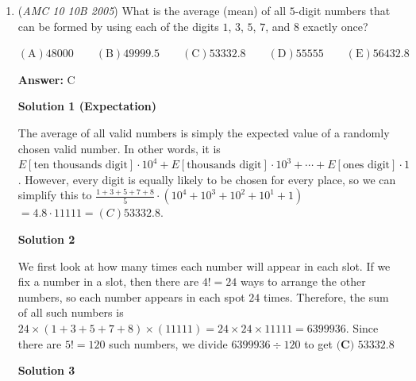 \begin{enumerate}
 



\textbf{Solution 2}

The remaining $30\%$ of the students got $95$ points.The mean is equal to $10\%\cdot70 + 25\%\cdot80 + 20\%\cdot85 + 15\%\cdot90 + 30\%\cdot95 = 86$.The score greater than or equal to $50\%$ of other scores is the median. Since $35\%$ scored $80$ or lower and the next $20\%$ scored $85$, the median is $85$. The difference between the mean and the median is $\boxed{\textbf{(B)}\ 1}$.

 


	\item (\textit{AMC 10 10B 2005}) What is the average (mean) of all $5$-digit numbers that can be formed by using each of the digits $1$, $3$, $5$, $7$, and $8$ exactly once?


 $\mathrm{(A)} 48000 \qquad \mathrm{(B)} 49999.5 \qquad \mathrm{(C)} 53332.8 \qquad \mathrm{(D)} 55555 \qquad \mathrm{(E)} 56432.8$

 \textbf{Answer: }C



\textbf{Solution 1 (Expectation)}

The average of all valid numbers is simply the expected value of a randomly chosen valid number. In other words, it is $E[\text{ten thousands digit}]\cdot 10^4+E[\text{thousands digit}]\cdot 10^3+\cdots+E[\text{ones digit}]\cdot 1$. However, every digit is equally likely to be chosen for every place, so we can simplify this to $\frac{1+3+5+7+8}{5}\cdot(10^4+10^3+10^2+10^1+1)$ $=4.8\cdot11111 = \boxed{(C) 53332.8}$.

 



\textbf{Solution 2}

We first look at how many times each number will appear in each slot. If we fix a number in a slot, then there are $4! = 24$ ways to arrange the other numbers, so each number appears in each spot $24$ times. Therefore, the sum of all such numbers is $24 \times (1+3+5+7+8) \times (11111) = 24 \times 24 \times 11111 = 6399936.$ Since there are $5! = 120$ such numbers, we divide $6399936 \div 120$ to get $\boxed{\textbf{(C) }53332.8}$




\textbf{Solution 3}


\end{enumerate}
